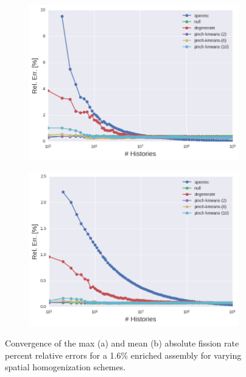 \begin{figure}[h!]
\centering
\begin{subfigure}{\textwidth}
  \centering
  \includegraphics[width=0.9\linewidth]{figures/results/assm-16/no-transform/evo-fission-max}
  \caption{}
  \label{fig:chap11-assm-1.6-fission-converge-max}
\end{subfigure}
\begin{subfigure}{\textwidth}
  \centering
  \includegraphics[width=0.9\linewidth]{figures/results/assm-16/no-transform/evo-fission-mean}
  \caption{}
  \label{fig:chap11-assm-1.6-fission-converge-mean}
\end{subfigure}
\vspace{2mm}
\caption[Fission rate covergence for a 1.6\% enriched assembly]{Convergence of the max (a) and mean (b) absolute fission rate percent relative errors for a 1.6\% enriched assembly for varying spatial homogenization schemes.}
\label{fig:chap11-assm-1.6-fission-converge}
\end{figure}

